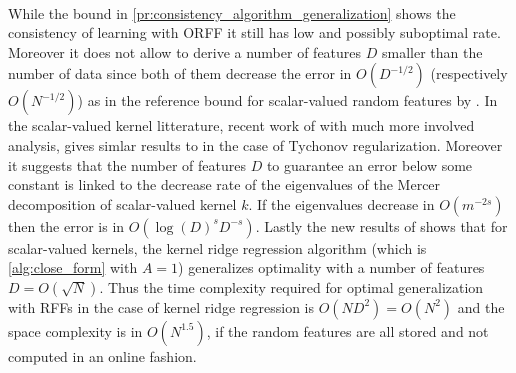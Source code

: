 \paragraph{}
While the bound in \cref{pr:consistency_algorithm_generalization} shows the
consistency of learning with \acs{ORFF} it still has low and possibly
suboptimal rate. Moreover it does not allow to derive a number of features $D$
smaller than the number of data since both of them decrease the error in
$O(D^{-1/2})$ (respectively $O(N^{-1/2})$) as in the reference bound for
scalar-valued random features by \citet{rahimi2009weighted}. In the
scalar-valued kernel litterature, recent work of \citet{bach2015equivalence}
with much more involved analysis, gives simlar results to
\citet{rahimi2009weighted} in the case of Tychonov regularization.  Moreover it
suggests that the number of features $D$ to guarantee an error below some
constant is linked to the decrease rate of the eigenvalues of the Mercer
decomposition of scalar-valued kernel $k$. If the eigenvalues decrease in
$O(m^{-2s})$ then the error is in $O\left(\log(D)^s D^{-s}\right)$. Lastly the
new results of \citet{rudi2016generalization} shows that for scalar-valued
kernels, the kernel ridge regression algorithm (which is \cref{alg:close_form}
with $A = 1$) generalizes optimality with a number of features $D=O(\sqrt{N})$.
Thus the time complexity required for optimal generalization with \acsp{RFF} in
the case of kernel ridge regression is $O(ND^2)=O(N^{2})$ and the space
complexity is in $O(N^{1.5})$, if the random features are all stored and not
computed in an online fashion.

\chapterend
